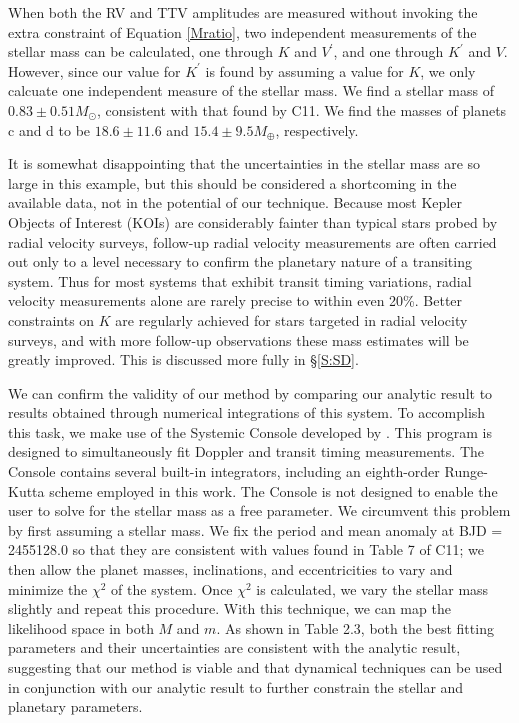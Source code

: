 When both the RV and TTV amplitudes are measured without invoking the extra constraint of Equation \ref{Mratio}, two independent measurements of the stellar mass can be calculated, one through $K$ and $V^\prime$, and one through $K^\prime$ and $V$. However, since our value for $K^\prime$ is found by assuming a value for $K$, we only calcuate one independent measure of the stellar mass. We find a stellar mass of $0.83 \pm 0.51 M_\odot$, consistent with that found by C11. We find the masses of planets c and d to be $18.6 \pm 11.6$ and $15.4 \pm 9.5 M_\oplus$, respectively.

It is somewhat disappointing that the uncertainties in the stellar mass are so large in this example, but this should be considered a shortcoming in the available data, not in the potential of our technique. Because most Kepler Objects of Interest (KOIs) are considerably fainter than typical stars probed by radial velocity surveys, follow-up radial velocity measurements are often carried out only to a level necessary to confirm the planetary nature of a transiting system. Thus for most systems that exhibit transit timing variations, radial velocity measurements alone are rarely precise to within even 20\%. Better constraints on $K$ are regularly achieved for stars targeted in radial velocity surveys, and with more follow-up observations these mass estimates will be greatly improved. This is discussed more fully in \S\ref{S:SD}.

We can confirm the validity of our method by comparing our analytic result to results obtained through numerical integrations of this system. To accomplish this task, we make use of the Systemic Console developed by \citet{Meschiari09}. This program is designed to simultaneously fit Doppler and transit timing measurements. The Console contains several built-in integrators, including an eighth-order Runge-Kutta scheme employed in this work. The Console is not designed to enable the user to solve for the stellar mass as a free parameter. We circumvent this problem by first assuming a stellar mass. We fix the period and mean anomaly at BJD = 2455128.0 so that they are consistent with values found in Table 7 of C11; we then allow the planet masses, inclinations, and eccentricities to vary and minimize the $\chi^2$ of the system. Once $\chi^2$ is calculated, we vary the stellar mass slightly and repeat this procedure. With this technique, we can map the likelihood space in both $M$ and $m$. As shown in Table 2.3, both the best fitting parameters and their uncertainties are consistent with the analytic result, suggesting that our method is viable and that dynamical techniques can be used in conjunction with our analytic result to further constrain the stellar and planetary parameters. 

